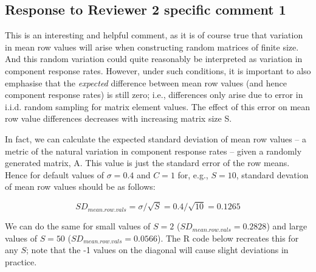 \documentclass[]{article}
\begin{document}
\subsection{Response to Reviewer 2 specific comment
1}\label{response-to-reviewer-2-specific-comment-1}

This is an interesting and helpful comment, as it is of course true that
variation in mean row values will arise when constructing random
matrices of finite size. And this random variation could quite
reasonably be interpreted as variation in component response rates.
However, under such conditions, it is important to also emphasise that
the \emph{expected} difference between mean row values (and hence
component response rates) is still zero; i.e., differences only arise
due to error in i.i.d. random sampling for matrix element values. The
effect of this error on mean row value differences decreases with
increasing matrix size S.

In fact, we can calculate the expected standard deviation of mean row
values -- a metric of the natural variation in component response rates
-- given a randomly generated matrix, A. This value is just the standard
error of the row means. Hence for default values of \(\sigma = 0.4\) and
\(C = 1\) for, e.g., \(S = 10\), standard devation of mean row values
should be as follows:

\[SD_{mean.row.vals} = \sigma / \sqrt{S} = 0.4 / \sqrt{10} = 0.1265\]

We can do the same for small values of \(S = 2\)
(\(SD_{mean.row.vals} = 0.2828\)) and large values of \(S = 50\)
(\(SD_{mean.row.vals} = 0.0566\)). The R code below recreates this for
any \(S\); note that the -1 values on the diagonal will cause slight
deviations in practice.
\end{document}

